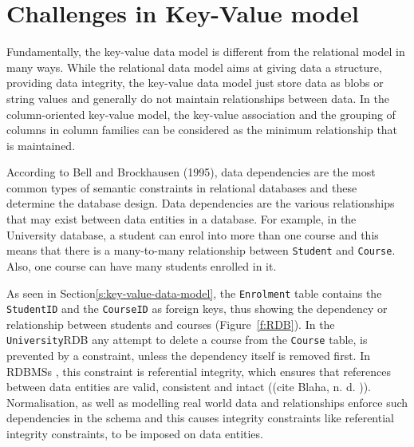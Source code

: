 \section{Challenges in Key-Value model}\label{s:challenges-key-value}
Fundamentally,   the key-value data model is different from the relational model
in many ways.  While the relational data model aims at giving data a structure,  
providing data integrity,   the key-value data model just
store data as \acp{blob} or string values and generally do not maintain
relationships between data.  In the column-oriented key-value model,   the
key-value association and the grouping of columns in column families can be
considered as the minimum relationship that is maintained.  

According to Bell and Brockhausen (1995),   data dependencies are the most
common types of semantic constraints in relational databases and these determine
the database design.  Data dependencies are the various relationships that may
exist between data entities in a database.  For example,   in the
University database,   a student can enrol into more than one course and this
means that there is a many-to-many relationship between \texttt{Student} and
\texttt{Course}.  Also,   one course can have many students enrolled in it.  

As seen in Section\ref{s:key-value-data-model},   the \texttt{Enrolment} table 
contains the \texttt{StudentID} and the \texttt{CourseID} as foreign keys,  
thus showing the dependency or relationship between students and courses
(Figure~\ref{f:RDB}). 
In the \texttt{University}\ac{RDB} any attempt to delete a course
from the \texttt{Course} table,   is prevented by a constraint,   unless the
dependency itself is removed first.  In \acp{RDBMS} ,   this constraint is referential
integrity,   which ensures that references between data entities are valid,  
consistent and intact (\todo(cite Blaha,   n. d. )). 
Normalisation,   as well as modelling real world data and
relationships enforce such dependencies in the schema and this causes integrity
constraints like referential integrity constraints,   to be imposed on data
entities. 

